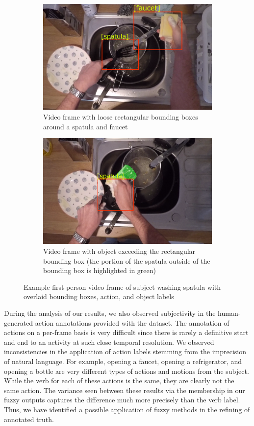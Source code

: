 \documentclass[12pt]{report}
\begin{document}
\begin{figure}[t]
\begin{subfigure}{.5\textwidth}
\centerline{\includegraphics[width=.8\linewidth]{figure/frame_4085_cropped.png}}
\caption{Video frame with loose rectangular bounding boxes around a spatula and faucet}
\label{sampleA}
\end{subfigure}
\begin{subfigure}{.5\textwidth}
\centerline{\includegraphics[width=.8\linewidth]{figure/frame_4527_cropped.png}}
\caption{Video frame with object exceeding the rectangular bounding box (the portion of the spatula outside of the bounding box is highlighted in green)}
\label{sampleB}
\end{subfigure}
\caption{Example first-person video frame of subject washing spatula with overlaid bounding boxes, action, and object labels}
\label{sampleFrame}
\end{figure}

During the analysis of our results, we also observed subjectivity in the human-generated action annotations provided with the dataset. The annotation of actions on a per-frame basis is very difficult since there is rarely a definitive start and end to an activity at such close temporal resolution. We observed inconsistencies in the application of action labels stemming from the imprecision of natural language. For example, opening a faucet, opening a refrigerator, and opening a bottle are very different types of actions and motions from the subject. While the verb for each of these actions is the same, they are clearly not the same action. The variance seen between these results via the membership in our fuzzy outputs captures the difference much more precisely than the verb label. Thus, we have identified a possible application of fuzzy methods in the refining of annotated truth.
\end{document}
